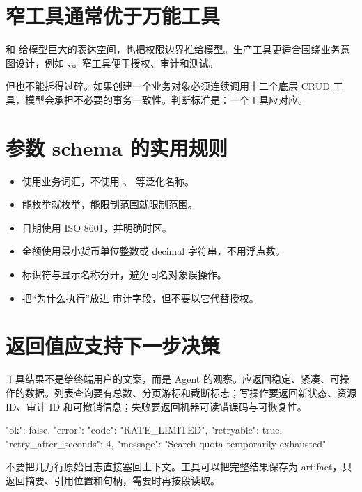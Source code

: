 \section{窄工具通常优于万能工具}

 和  给模型巨大的表达空间，也把权限边界推给模型。生产工具更适合围绕业务意图设计，例如 、。窄工具便于授权、审计和测试。

但也不能拆得过碎。如果创建一个业务对象必须连续调用十二个底层 CRUD 工具，模型会承担不必要的事务一致性。判断标准是：一个工具应对应。

\section{参数 schema 的实用规则}

\begin{itemize}
  \item 使用业务词汇，不使用 、 等泛化名称。
  \item 能枚举就枚举，能限制范围就限制范围。
  \item 日期使用 ISO 8601，并明确时区。
  \item 金额使用最小货币单位整数或 decimal 字符串，不用浮点数。
  \item 标识符与显示名称分开，避免同名对象误操作。
  \item 把“为什么执行”放进  审计字段，但不要以它代替授权。
\end{itemize}

\section{返回值应支持下一步决策}

工具结果不是给终端用户的文案，而是 Agent 的观察。应返回稳定、紧凑、可操作的数据。列表查询要有总数、分页游标和截断标志；写操作要返回新状态、资源 ID、审计 ID 和可撤销信息；失败要返回机器可读错误码与可恢复性。

\begin{codeblock}
{
  "ok": false,
  "error": {
    "code": "RATE_LIMITED",
    "retryable": true,
    "retry_after_seconds": 4,
    "message": "Search quota temporarily exhausted"
  }
}
\end{codeblock}

不要把几万行原始日志直接塞回上下文。工具可以把完整结果保存为 artifact，只返回摘要、引用位置和句柄，需要时再按段读取。

